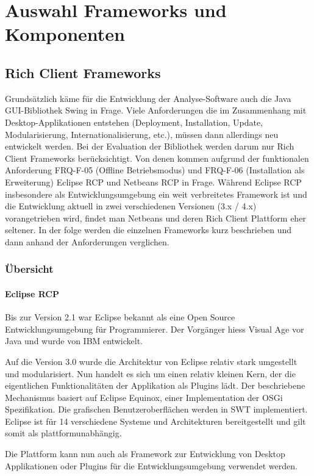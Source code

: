 \chapter{Auswahl Frameworks und Komponenten}\label{selection_rcp_fw}
\section{Rich Client Frameworks}
Grundsätzlich käme für die Entwicklung der Analyse-Software auch die Java GUI-Bibliothek Swing in Frage. Viele Anforderungen die im Zusammenhang mit Desktop-Applikationen entstehen (Deployment, Installation, Update, Modularisierung, Internationalisierung, etc.), müssen dann allerdings neu entwickelt werden. Bei der Evaluation der Bibliothek werden darum nur Rich Client Frameworks berücksichtigt. Von denen kommen aufgrund der funktionalen Anforderung FRQ-F-05 (Offline Betriebsmodus) und FRQ-F-06 (Installation als Erweiterung) Eclipse RCP und Netbeans RCP in Frage. Während Eclipse RCP insbesondere als Entwicklungsumgebung ein weit verbreitetes Framework ist und die Entwicklung aktuell in zwei verschiedenen Versionen (3.x / 4.x) vorangetrieben wird, findet man Netbeans und deren Rich Client Plattform eher seltener. In der folge werden die einzelnen Frameworks kurz beschrieben und dann anhand der Anforderungen verglichen.


\subsection{Übersicht}
\subsubsection{Eclipse RCP}
Bis zur Version 2.1 war Eclipse bekannt als eine Open Source Entwicklungsumgebung für Programmierer. Der Vorgänger hiess Visual Age vor Java und wurde von IBM entwickelt. 

Auf die Version 3.0 wurde die Architektur von Eclipse relativ stark umgestellt und modularisiert. Nun handelt es sich um einen relativ kleinen Kern, der die eigentlichen Funktionalitäten der Applikation als Plugins lädt. Der beschriebene Mechanismus basiert auf Eclipse Equinox, einer Implementation der OSGi Spezifikation. Die grafischen Benutzeroberflächen werden in SWT implementiert. Eclipse ist für 14 verschiedene Systeme und Architekturen bereitgestellt und gilt somit als plattformunabhängig\cite{wiki:eclipse}. 

Die Plattform kann nun auch als Framework zur Entwicklung von Desktop Applikationen oder Plugins für die Entwicklungsumgebung  verwendet werden.


